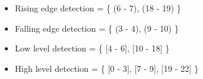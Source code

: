 \documentclass[12pt,letterpaper]{article}
\begin{document}
\begin{enumerate}
		\begin{itemize}
			 \item 
			 Rising edge detection = \{ (6 - 7), (18 - 19) \}
			 
			 
			 \item 
			 Falling edge detection = \{ (3 - 4), (9 - 10) \}
			 
			 
			 \item 
			 Low level detection = \{ [4 - 6], [10 - 18] \}
			 
			 
			 \item
			High level detection = \{ [0 - 3], [7 - 9], [19 - 22] \}
			
			
		\end{itemize}
		
	\end{enumerate}
\end{document}
